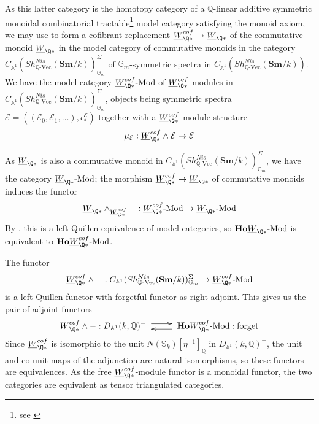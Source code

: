 \documentclass[a4paper,12pt,draft]{amsart}
\theoremstyle{definition}
\theoremstyle{remark}
\begin{document}
As this latter category is the homotopy category of a ${{\mathbb Q}}$-linear additive symmetric monoidal combinatorial tractable\footnote{see \cite[Definition 3.1.27]{CD}} model category satisfying the monoid axiom, we may use \cite[Theorem 7.1.8]{CD} to form a cofibrant replacement $\underline{W}^{cof}_{\Q*}\to \underline{W}_{\Q*}$  of the commutative monoid $\underline{W}_{\Q*}$ in the model category of commutative monoids in the category $C_{{{\mathbb A}}^1}(Sh_{{{\mathbb Q}}\text{-Vec}}^{Nis}({{\mathbf{Sm}}}/k))^\Sigma_{{{\mathbb G}}_m}$ of  ${{\mathbb G}}_m$-symmetric spectra in $C_{{{\mathbb A}}^1}(Sh_{{{\mathbb Q}}\text{-Vec}}^{Nis}({{\mathbf{Sm}}}/k))$. We have the model category $\underline{W}^{cof}_{\Q*}\text{-Mod}$ of  $\underline{W}^{cof}_{\Q*}$-modules in $C_{{{\mathbb A}}^1}(Sh_{{{\mathbb Q}}\text{-Vec}}^{Nis}({{\mathbf{Sm}}}/k))^\Sigma_{{{\mathbb G}}_m}$, objects being symmetric spectra ${{\mathcal E}}=(({{\mathcal E}}_0, {{\mathcal E}}_1,\ldots), \epsilon^{{\mathcal E}}_*)$ together with a $\underline{W}^{cof}_{\Q*}$-module structure
\[
\mu_{{\mathcal E}}:\underline{W}^{cof}_{\Q*}\wedge {{\mathcal E}}\to {{\mathcal E}}
\]

As $\underline{W}_{\Q*}$ is also a commutative monoid in $C_{{{\mathbb A}}^1}(Sh_{{{\mathbb Q}}\text{-Vec}}^{Nis}({{\mathbf{Sm}}}/k))^\Sigma_{{{\mathbb G}}_m}$, we have 
the category $\underline{W}_{\Q*}\text{-Mod}$; the morphism $\underline{W}^{cof}_{\Q*}\to \underline{W}_{\Q*}$ of commutative monoids induces the functor
\[
\underline{W}_{\Q*}\wedge_{\underline{W}^{cof}_{\Q*}}-:\underline{W}^{cof}_{\Q*}\text{-Mod}\to \underline{W}_{\Q*}\text{-Mod}
\]
By \cite[Theorem 4.3]{SS}, this is a left Quillen equivalence of model categories,  so  ${{\mathbf{Ho}}} \underline{W}_{\Q*}\text{-Mod}$ is equivalent to  ${{\mathbf{Ho}}}\underline{W}^{cof}_{\Q*}\text{-Mod}$.

The functor
\[
\underline{W}^{cof}_{\Q*}\wedge-:C_{{{\mathbb A}}^1}(Sh_{{{\mathbb Q}}\text{-Vec}}^{Nis}({{\mathbf{Sm}}}/k))^\Sigma_{{{\mathbb G}}_m}\to
\underline{W}^{cof}_{\Q*}\text{-Mod}
\]
is a left Quillen functor with forgetful functor as right adjoint. This gives us  the pair of adjoint functors
\[
\underline{W}^{cof}_{\Q*}\wedge-:D_{{{\mathbb A}}^1}(k,{{\mathbb Q}})^-\xymatrixrowsep{2pt}\xymatrix{\ar@<3pt>[r]&\ar@<3pt>[l]} 
 {{\mathbf{Ho}}} \underline{W}^{cof}_{\Q*}\text{-Mod}:\text{forget}
 \]
Since  $\underline{W}^{cof}_{\Q*}$ is isomorphic to the unit $N({{\mathbb S}}_k)[\eta^{-1}]_{{\mathbb Q}}$ in $D_{{{\mathbb A}}^1}(k,{{\mathbb Q}})^-$, the unit and co-unit maps of the adjunction are natural isomorphisms, so these functors are equivalences. As the free $\underline{W}^{cof}_{\Q*}$-module functor is a monoidal functor, the two categories are equivalent as tensor  triangulated categories.
\end{document}
